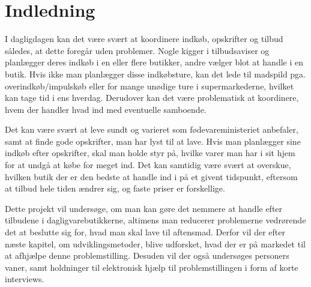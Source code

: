 \chapter{Indledning}\label{chapter:indledning}

I dagligdagen kan det være svært at koordinere indkøb, opskrifter og tilbud således, at dette foregår uden problemer. Nogle kigger i tilbudsaviser og planlægger deres indkøb i en eller flere butikker, andre vælger blot at handle i en butik.
Hvis ikke man planlægger disse indkøbsture, kan det lede til madspild pga. overindkøb/impulskøb eller for mange unødige ture i supermarkederne, hvilket kan tage tid i ens hverdag. Derudover kan det være problematisk at koordinere, hvem der handler hvad ind med eventuelle samboende.

Det kan være svært at leve sundt og varieret som fødevareministeriet anbefaler, samt  at finde gode opskrifter, man har lyst til at lave.
Hvis man planlægger sine indkøb efter opskrifter, skal man holde styr på, hvilke varer man har i sit hjem for at undgå at købe for meget ind. Det kan samtidig være svært at overskue, hvilken butik der er den bedste at handle ind i på et givent tidspunkt, eftersom at tilbud hele tiden ændrer sig, og faste priser er forskellige. 

Dette projekt vil undersøge, om man kan gøre det nemmere at handle efter tilbudene i dagligvarebutikkerne, altimens man reducerer problemerne vedrørende det at beslutte sig for, hvad man skal lave til aftensmad.
Derfor vil der efter næste kapitel, om udviklingsmetoder, blive udforsket, hvad der er på markedet til at afhjælpe denne problemstilling.
Desuden vil der også undersøges personers vaner, samt holdninger til elektronisk hjælp til problemstillingen i form af korte interviews.
